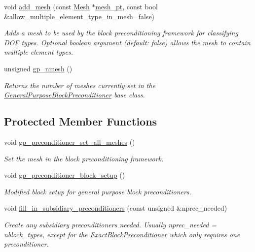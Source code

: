 \begin{DoxyCompactItemize}
void \hyperlink{classoomph_1_1GeneralPurposeBlockPreconditioner_a8a92f8e0db68105f2fb548e5f7cd0732}{add\+\_\+mesh} (const \hyperlink{classoomph_1_1Mesh}{Mesh} $\ast$\hyperlink{classoomph_1_1BlockPreconditioner_a3c0e92cb77c3e3179007fe9fd99b6428}{mesh\+\_\+pt}, const bool \&allow\+\_\+multiple\+\_\+element\+\_\+type\+\_\+in\+\_\+mesh=false)
\begin{DoxyCompactList}\small\item\em Adds a mesh to be used by the block preconditioning framework for classifying D\+OF types. Optional boolean argument (default\+: false) allows the mesh to contain multiple element types. \end{DoxyCompactList}\item 
unsigned \hyperlink{classoomph_1_1GeneralPurposeBlockPreconditioner_af4bfec71b00d7d7e8021c691d1cbe076}{gp\+\_\+nmesh} ()
\begin{DoxyCompactList}\small\item\em Returns the number of meshes currently set in the \hyperlink{classoomph_1_1GeneralPurposeBlockPreconditioner}{General\+Purpose\+Block\+Preconditioner} base class. \end{DoxyCompactList}\end{DoxyCompactItemize}
\subsection*{Protected Member Functions}
\begin{DoxyCompactItemize}
\item 
void \hyperlink{classoomph_1_1GeneralPurposeBlockPreconditioner_a99a80a26b189ecabeb3e7dfad9c45f0c}{gp\+\_\+preconditioner\+\_\+set\+\_\+all\+\_\+meshes} ()
\begin{DoxyCompactList}\small\item\em Set the mesh in the block preconditioning framework. \end{DoxyCompactList}\item 
void \hyperlink{classoomph_1_1GeneralPurposeBlockPreconditioner_ae6b28f722b439af1f1a71a2328d4567a}{gp\+\_\+preconditioner\+\_\+block\+\_\+setup} ()
\begin{DoxyCompactList}\small\item\em Modified block setup for general purpose block preconditioners. \end{DoxyCompactList}\item 
void \hyperlink{classoomph_1_1GeneralPurposeBlockPreconditioner_aba4af808888e35785cce631722c926cd}{fill\+\_\+in\+\_\+subsidiary\+\_\+preconditioners} (const unsigned \&nprec\+\_\+needed)
\begin{DoxyCompactList}\small\item\em Create any subsidiary preconditioners needed. Usually nprec\+\_\+needed = nblock\+\_\+types, except for the \hyperlink{classoomph_1_1ExactBlockPreconditioner}{Exact\+Block\+Preconditioner} which only requires one preconditioner. \end{DoxyCompactList}\end{DoxyCompactItemize}
